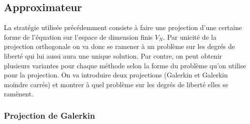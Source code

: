 \documentclass[french]{article}
\begin{document}
	\subsection{Approximateur}
	
	La stratégie utilisée précédemment consiste à faire une projection d’une certaine forme de l’équation sur l’espace de dimension finis $V_N$. Par unicité de la projection orthogonale on va donc se ramener à un problème sur les degrés de liberté qui lui aussi aura une unique solution. Par contre, on peut obtenir plusieurs variantes pour chaque méthode selon la forme du problème qu’on utilise pour la projection. On va introduire deux projections (Galerkin et Galerkin moindre carrés) et montrer à quel problème sur les degrés de liberté elles se ramènent.
	
	\subsubsection{Projection de Galerkin}
			
\end{document}
